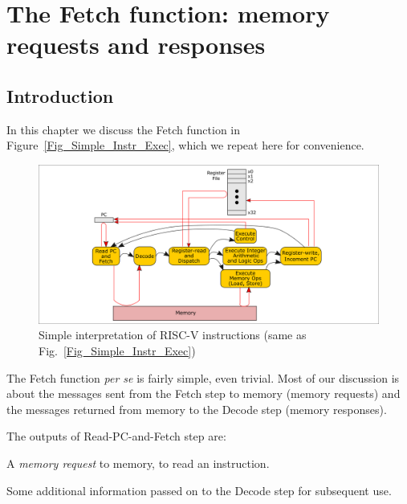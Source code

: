 

\chapter{The Fetch function: memory requests and responses}


\setcounter{page}{1}
\renewcommand{\thepage}{\arabic{chapter}-\arabic{page}}

\label{ch_Fetch_function}


\section{Introduction}

In this chapter we discuss the Fetch function in
Figure~\ref{Fig_Simple_Instr_Exec}, which we repeat here for
convenience.
\begin{figure}[htbp]
  \centerline{\includegraphics[width=6in,angle=0]{ch030_RISCV_Design_Space/Figures/Fig_Simple_Instr_Exec}}
  \caption{\label{Fig_Fetch_function_Simple_Instr_Exec}Simple interpretation of RISC-V instructions (same as Fig.~\ref{Fig_Simple_Instr_Exec})}
\end{figure}
The Fetch function \emph{per se} is fairly simple, even trivial.  Most
of our discussion is about the messages sent from the Fetch step to
memory (memory requests) and the messages returned from memory to the
Decode step (memory responses).

The outputs of Read-PC-and-Fetch step are:
\begin{tightlist}

 \item A \emph{memory request} to memory, to read an instruction.

 \item Some additional information passed on to the Decode step for subsequent use.

\end{tightlist}


